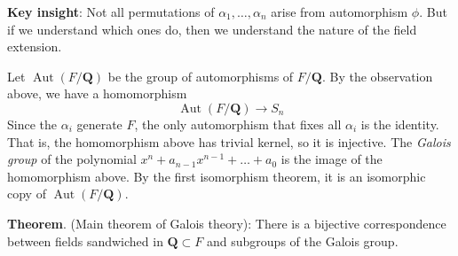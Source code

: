 \documentclass[11pt]{article}
\begin{document}
\textbf{\textbf{Key insight}}: Not all permutations of \(\alpha_1, \dots, \alpha_n\) arise from automorphism \(\phi\).
But if we understand which ones do, then we understand the nature of the field extension.

Let \(\operatorname{Aut}(F / \mathbf{Q})\) be the group of automorphisms of \(F/\mathbf{Q}\).
By the observation above, we have a homomorphism
\[ \operatorname{Aut}(F / \mathbf{Q} ) \to S_{n}\]
Since the \(\alpha_i\) generate \(F\), the only automorphism that fixes all \(\alpha_{i}\) is the identity.
That is, the homomorphism above has trivial kernel, so it is injective.
The \emph{Galois group} of the polynomial \(x^n+a_{n-1}x^{n-1}+ \dots +a_{0}\) is the image of the homomorphism above.
By the first isomorphism theorem, it is an isomorphic copy of \(\operatorname{Aut}(F / \mathbf{Q} )\).

\textbf{\textbf{Theorem}}. (Main theorem of Galois theory):
There is a bijective correspondence between fields sandwiched in \(\mathbf{Q} \subset F\) and subgroups of the Galois group.
\end{document}
